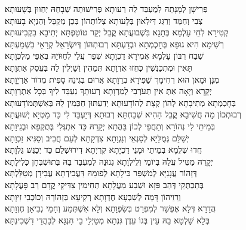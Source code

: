 \documentclass[twoside, openany, parskip=half, 11pt]{book}
\begin{document}
\begin{footnotesize}
\shatz
פְּרִישָׁן לְמָנָתֵהּ לְמֶעְבַּד לֵהּ רְעוּתָא פְּרִישׁוּתֵה שְׁבָחֵהּ יְחַוּוּן בְּשָׁעוּתָא׃\\
\kahal
צְבִי וְחַמֵּד וְרַגֵּג דְּיִלְאוּן בְּלָעוּתָא צְלוֹתְהוֹן בְּכֵן מְקַבֵּל וְהַנְיָא בָעוּתָא׃\\
\shatz
קְטִירָא לְחֵי עָלְמָא בְּתָגָא בִּשְׁבוּעֲתָא קֳבֵל יְקַר טוֹטַפְתָּא יְתִיבָא בִקְבִיעוּתָא׃\\
\kahal
רְשִׁימָא הִיא גוּפָא בְּחׇכְמְתָא וּבְדַעְתָּא רְבוּתְהוֹן דְּיִשְׂרָאֵל קְרָאֵי בִשְׁמַעְתָּא׃\\
\shatz
שְׁבַח רִבּוֹן עָלְמָא אֲמִירָא דַכְוָתָא שְׁפַר עֲלַי לְחַוּוֹיֵהּ בְּאַפֵּי מַלְכְּוָתָא׃\\
\kahal
תָּאִין וּמִתְכַּנְּשִׁין כְּחֵזוּ אִדְוָתָא תְּמֵהִין וְשָׁיְלִין לֵהּ בְּעֵסֶק אַתְוָתָא׃\\
\shatz
מְנָן וּמָאן הוּא רְחִימָךְ שַׁפִּירָא בְרֵוָתָא אֲרוּם בְּגִינֵהּ סָפִית מְדוֹר אַרְיָוָתָא׃\\
\kahal
יְקָרָא וְיָאָה אַתְּ אִין תְּעֹרְבִי לְמַרְוָתָא רְעוּתֵךְ נַעְבֵּד לִיךְ בְּכׇל אַתְרְוָתָא׃\\
\shatz
בְּחׇכְמְתָא מְתִיבָתָא לְהוֹן קְצָת לְהוֹדָעוּתָא יְדַעְתּוּן חַכְּמִין לֵהּ בְּאִשְׁתְּמוֹדָעוּתָא׃\\
\kahal
רְבוּתְכוֹן מָה חֲשִׁיבָא קֳבֵל הַהִיא שְׁבַחְתָּא רְבוּתָא דְּיַעְבֵּד לִי כַּד מַטְיָא יְשׁוּעֲתָא׃\\
\shatz
בְּמֵיתֵי לִי נְהוֹרָא וְתַחֲפֵי לְכוֹן בַּהֲתָא יְקָרֵהּ כַּד אִתְגְּלִי בְּתֻקְפָא וּבְגֵיוָתָא׃\\
\kahal
יְשַׁלֵּם גְּמֻלַּיָּא לְסַנְאֵי וְנַגְוָתָא צִדְקָתָא לְעַם חֲבִיב וְסַגִּיא זַכְוָתָא׃\\
\shatz
חֲדוּ שְׁלֵמָא בְּמֵיתֵי וּמָנֵי דַכְיָתָא קִרְיְתָא דִירוּשְׁלֵם כַּד יְכַנֵּשׁ גַּלְוָתָא׃\\
\kahal
יְקָרֵהּ מַטִּיל עֲלַהּ בְּיוֹמֵי וְלֵילְוָתָא גְּנוּנֵהּ לְמֶעְבַּד בַּהּ בְּתוּשְׁבְּחָן כְּלִילָתָא׃\\
\shatz
דְּזֵהוֹר עֲנָנַיָּא לְמִשְׁפַּר כִּילָתָא לְפוּמֵהּ דַּעֲבִידְתָּא עֲבִידָן מְטַלַּלְתָּא׃\\
\kahal
בְּתַכְתְּקֵי דְּהַב פִּזָּא וּשְׁבַע מַעֲלָתָא תְּחִימִין צַדִּיקֵי קֳדָם רַב פׇּעֳלָתָא׃\\
\shatz
וְרֵוֵיהוֹן דָּמֵה לְשַׁבְעָא חֶדְוָתָא רְקִיעָא בְּזֵהוֹרֵהּ וְכוֹכְבֵי זִיוָתָא׃\\
\kahal
הֲדָרָא דְּלָא אֶפְשַׁר לְמִפְרַט בְּשִׂפְוָתָא וְלָא אִשְׁתְּמַע וְחָמֵי נְבִיאָן חֶזְוָתָא׃\\
\shatz
בְּלָא שָׁלְטָא בֵהּ עֵין בְּגוֹ עֵדֶן גִּנְתָא מְטַיְלֵי בֵי חִנְגָּא לְבַהֲדֵי דִשְׁכִינְתָּא׃\\

\end{footnotesize}
\end{document}
